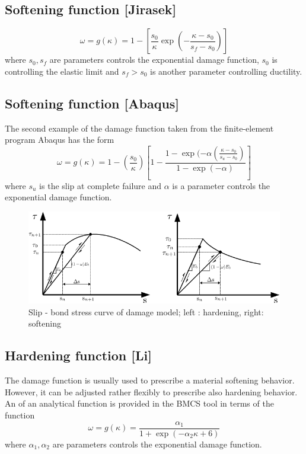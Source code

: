 \documentclass[main.tex]{subfiles}
\begin{document}
\subsection{Softening function [Jirasek]}
\begin{equation}
\omega = g(\kappa) = 1 - \left[\frac{s_0}{\kappa} \exp \left(- \frac{\kappa - s_0}{s_f - s_0}\right)\right]
\end{equation}
where $s_0, s_f$ are parameters controls the exponential damage function, $s_0$ is controlling the elastic limit and $s_f > s_0$ is another parameter controlling ductility.

\subsection{Softening function [Abaqus]}
The second example of the damage function taken from the finite-element program Abaqus has the form
\begin{equation}
\omega = g(\kappa) = 1 -\left(\frac{s_0}{\kappa}\right)\left[ 1 - \frac{1 - \exp(- \alpha(\frac{\kappa - s_0}{s_u - s_0})}{1 - \exp(-\alpha)}  \right]
\end{equation}
where $s_u$ is the slip at complete failure and $\alpha$ is a parameter controls the exponential damage function.

\begin{figure}[ht]
	\centering
  \includegraphics[scale=0.7]{fig/Damage_01.png}
	\caption{Slip - bond stress curve of damage model; left : hardening, right: softening}
	\label{FIG_damage_softening_hardening}
\end{figure}

\subsection{Hardening function [Li]}
The damage function is usually used to prescribe a material softening behavior. However, it can be adjusted rather 
flexibly to prescribe also hardening behavior. An of an analytical function is provided in the BMCS tool 
in terms of the function
\begin{equation}
\omega = g(\kappa) = \frac{\alpha_1}{1 + \exp(-\alpha_2 \kappa + 6 )}
\end{equation}
where $\alpha_1, \alpha_2$ are parameters controls the exponential damage function.
\end{document}
